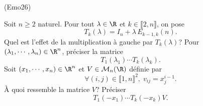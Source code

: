 \begin{tiny}(Emo26)\end{tiny} Soit $n\geq 2$ naturel. Pour tout $\lambda \in  \R$ et $k\in \llbracket 2,n\rrbracket$, on pose
\[
 T_k(\lambda) = I_n + \lambda\,E_{k-1,k}(n).
\]
Quel est l'effet de la multiplication à gauche par $T_k(\lambda)$? Pour $(\lambda_1,\cdots, \lambda_n)\in \R^n$, préciser la matrice
\[
 T_1(\lambda_1) \cdots T_k(\lambda_k).
\]
Soit $(x_1, \cdots , x_n)\in \R^n$ et $V \in \mathcal{M}_n(\R)$ définie par
\[
 \forall (i,j)\in \llbracket 1,n \rrbracket^2, \; v_{i j} = x_j^{i-1}.
\]
\`A quoi ressemble la matrice $V$? Préciser 
\[
 T_1(-x_1) \cdots T_k(-x_k) V.
\]
